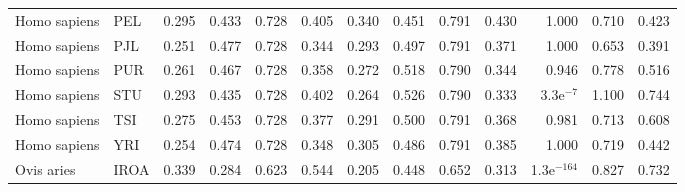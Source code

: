 \begin{longtable}{llrrrrrrrrrrr}
        Homo sapiens &                       PEL &                              0.295 &                               0.433 &                 0.728 &                 0.405 &                              0.340 &                               0.451 &                 0.791 &                 0.430 &         1.000 &  0.710 &  0.423 \\
        Homo sapiens &                       PJL &                              0.251 &                               0.477 &                 0.728 &                 0.344 &                              0.293 &                               0.497 &                 0.791 &                 0.371 &         1.000 &  0.653 &  0.391 \\
        Homo sapiens &                       PUR &                              0.261 &                               0.467 &                 0.728 &                 0.358 &                              0.272 &                               0.518 &                 0.790 &                 0.344 &         0.946 &  0.778 &  0.516 \\
        Homo sapiens &                       STU &                              0.293 &                               0.435 &                 0.728 &                 0.402 &                              0.264 &                               0.526 &                 0.790 &                 0.333 &   3.3e$^{-7}$ &  1.100 &  0.744 \\
        Homo sapiens &                       TSI &                              0.275 &                               0.453 &                 0.728 &                 0.377 &                              0.291 &                               0.500 &                 0.791 &                 0.368 &         0.981 &  0.713 &  0.608 \\
        Homo sapiens &                       YRI &                              0.254 &                               0.474 &                 0.728 &                 0.348 &                              0.305 &                               0.486 &                 0.791 &                 0.385 &         1.000 &  0.719 &  0.442 \\
          Ovis aries &                      IROA &                              0.339 &                               0.284 &                 0.623 &                 0.544 &                              0.205 &                               0.448 &                 0.652 &                 0.313 & 1.3e$^{-164}$ &  0.827 &  0.732 \\

\end{longtable}
